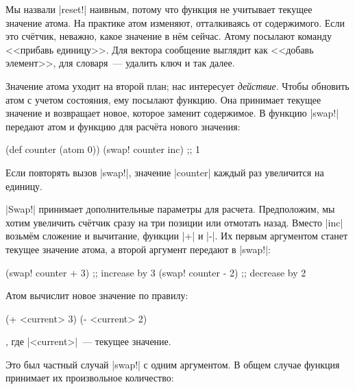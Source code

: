 
Мы назвали \spverb|reset!| наивным, потому что функция не учитывает текущее
значение атома. На практике атом изменяют, отталкиваясь от содержимого. Если это
счётчик, неважно, какое значение в нём сейчас. Атому посылают команду <<прибавь
единицу>>. Для вектора сообщение выглядит как <<добавь элемент>>, для
словаря~--- удалить ключ и так далее.

Значение атома уходит на второй план; нас интересует \emph{действие}. Чтобы
обновить атом с учетом состояния, ему посылают функцию. Она принимает текущее
значение и возвращает новое, которое заменит содержимое. В функцию
\spverb|swap!| передают атом и функцию для расчёта нового значения:


\begin{english}
  \begin{clojure}
(def counter (atom 0))
(swap! counter inc) ;; 1
  \end{clojure}
\end{english}

\noindent
Если повторять вызов \spverb|swap!|, значение \spverb|counter| каждый раз
увеличится на единицу.

\spverb|Swap!| принимает дополнительные параметры для расчета. Предположим, мы
хотим увеличить сч\"{е}тчик сразу на три позиции или отмотать назад. Вместо
\spverb|inc| возьмём сложение и вычитание, функции \spverb|+| и \spverb|-|. Их
первым аргументом станет текущее значение атома, а второй аргумент передают в
\spverb|swap!|:

\begin{english}
  \begin{clojure}
(swap! counter + 3) ;; increase by 3
(swap! counter - 2) ;; decrease by 2
  \end{clojure}
\end{english}

\noindent
Атом вычислит новое значение по правилу:

\begin{english}
  \begin{clojure}
(+ <current> 3)
(- <current> 2)
  \end{clojure}
\end{english}

\noindent
, где \spverb|<current>|~--- текущее значение.

Это был частный случай \spverb|swap!| с одним аргументом. В общем случае функция
принимает их произвольное количество:

